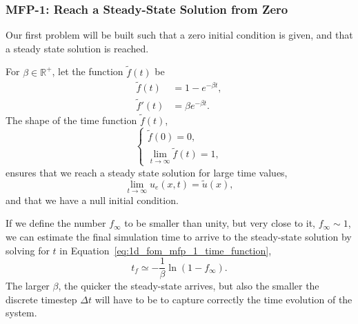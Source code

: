 \documentclass[../main.tex]{subfiles}
\begin{document}

\subsubsection{MFP-1: Reach a Steady-State Solution from Zero}
Our first problem will be built such that a zero initial condition is given, and that a steady state solution is reached. 

For $\beta \in \mathbb{R}^{+}$, let the function $\tilde{f}(t)$ be
\begin{subequations}
    \begin{align}
        \tilde{f}(t) &= 1 - e^{-\beta t}, \label{eq:1d_fom_mfp_1_time_function}\\
        \tilde{f}'(t) &= \beta e^{-\beta t}.
    \end{align}
\end{subequations}
The shape of the time function $\tilde{f}(t)$,
\begin{equation*}
    \begin{cases}
    \tilde{f}(0) = 0, \\ 
    \lim_{t \rightarrow \infty} \tilde{f}(t) = 1,
    \end{cases}
\end{equation*}
ensures that we reach a steady state solution for large time values,
\begin{equation}
    \lim_{t\rightarrow \infty} u_e(x,t) = \tilde{u}(x),
\end{equation}
and that we have a null initial condition.

If we define the number $f_\infty$ to be smaller than unity, but very close to it, $f_\infty \sim 1$, we can estimate the final simulation time to arrive to the steady-state solution by solving for $t$ in Equation~\eqref{eq:1d_fom_mfp_1_time_function},
\begin{equation}
    t_f \simeq - \frac{1}{\beta} \ln(1 - f_\infty).
\end{equation}
The larger $\beta$, the quicker the steady-state arrives, but also the smaller the discrete timestep $\Delta t$ will have to be to capture correctly the time evolution of the system.
\end{document}
